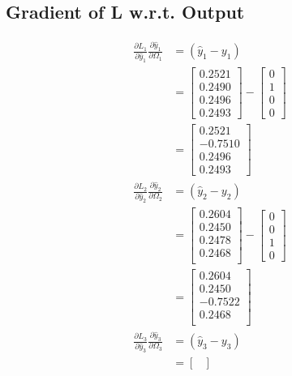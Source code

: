 \documentclass{article}
\begin{document}
\subsection{Gradient of L w.r.t. Output}
\begin{align*}
\frac{\partial L_1}{\partial \hat{y}_1}\frac{\partial \hat{y}_1}{\partial \Omega_1} &= (\hat{y}_{1}-y_{1})\\
&= \begin{bmatrix}
 0.2521 \\
 0.2490 \\
 0.2496 \\
 0.2493
\end{bmatrix} - \begin{bmatrix} 0 \\ 1 \\ 0 \\ 0 \end{bmatrix} \\
&=\begin{bmatrix}
 0.2521 \\
 -0.7510 \\
 0.2496 \\
 0.2493
\end{bmatrix} \\
\frac{\partial L_2}{\partial \hat{y}_2}\frac{\partial \hat{y}_2}{\partial \Omega_2} &= (\hat{y}_{2}-y_{2})\\
&= \begin{bmatrix}
 0.2604 \\
 0.2450\\
 0.2478\\
 0.2468\\
\end{bmatrix} - \begin{bmatrix} 0 \\ 0 \\ 1 \\ 0 \end{bmatrix}\\
&= \begin{bmatrix}
 0.2604 \\
 0.2450\\
 -0.7522\\
 0.2468\\
\end{bmatrix}  \\
\frac{\partial L_3}{\partial \hat{y}_3}\frac{\partial \hat{y}_3}{\partial \Omega_3} &= (\hat{y}_{3}-y_{3})\\
&= \begin{bmatrix}

\end{bmatrix}
\end{align*}
\end{document}
